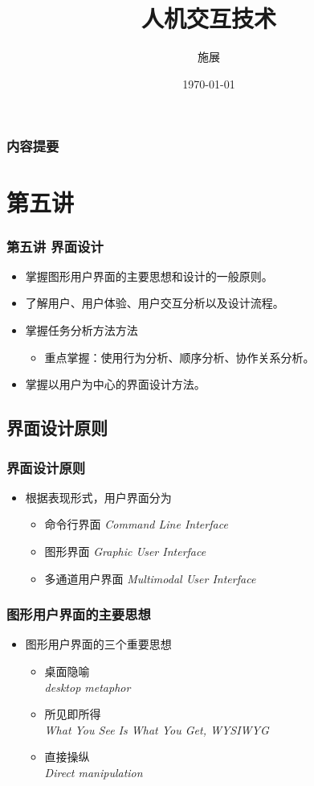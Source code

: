 \documentclass{beamer}
\title{人机交互技术}
\author{施展}
\institute{华中科技大学~武汉光电国家实验室}
\date{\today}
\begin{document}
\begin{frame}
	\titlepage
\end{frame}

\begin{frame}
	\frametitle{内容提要}
	\tableofcontents
\end{frame}

\section{第五讲}
\begin{frame}
	\frametitle{第五讲 界面设计}
	\begin{itemize}
		\item 掌握图形用户界面的主要思想和设计的一般原则。
		\item 了解用户、用户体验、用户交互分析以及设计流程。
		\item 掌握任务分析方法方法
		\begin{itemize}
			\item 重点掌握：使用行为分析、顺序分析、协作关系分析。
		\end{itemize}
		\item 掌握以用户为中心的界面设计方法。
	\end{itemize}
\end{frame}

\subsection{界面设计原则}
\begin{frame}
	\frametitle{界面设计原则}
	\begin{itemize}
		\item 根据表现形式，用户界面分为
		\begin{itemize}
			\item 命令行界面 \textit{Command Line Interface}
			\item 图形界面 \textit{Graphic User Interface}
			\item 多通道用户界面 \textit{Multimodal User Interface}
		\end{itemize}
	\end{itemize}
\end{frame}

\begin{frame}
	\frametitle{图形用户界面的主要思想}
	\begin{itemize}
		\item 图形用户界面的三个重要思想
		\begin{itemize}
			\item 桌面隐喻\\\textit{desktop metaphor}
			\item 所见即所得\\\textit{What You See Is What You Get, WYSIWYG}
			\item 直接操纵\\\textit{Direct manipulation}
		\end{itemize}
	\end{itemize}
\end{frame}
\end{document}
